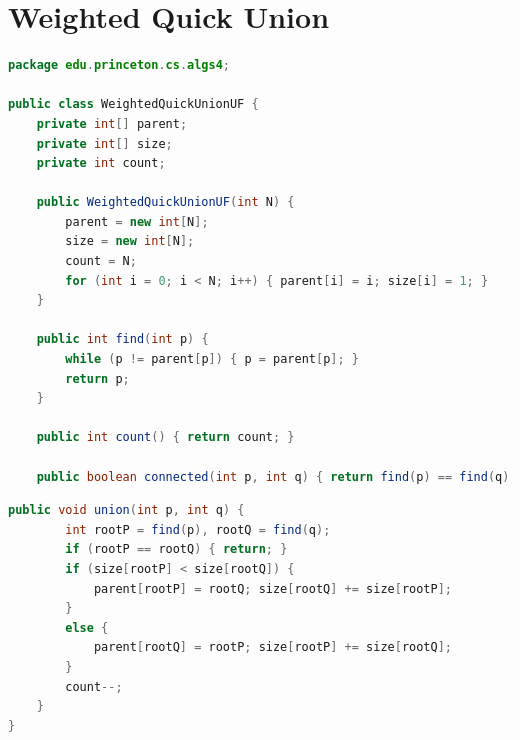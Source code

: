 \documentclass[8pt,a4paper,compress]{beamer}
\begin{document}
\section{Weighted Quick Union}
\begin{frame}[fragile]
\pause

\begin{lstlisting}[language=Java,style=focusin]
package edu.princeton.cs.algs4;

public class WeightedQuickUnionUF {
    private int[] parent;
    private int[] size;
    private int count;

    public WeightedQuickUnionUF(int N) {
        parent = new int[N];
        size = new int[N];
        count = N;
        for (int i = 0; i < N; i++) { parent[i] = i; size[i] = 1; }
    }

    public int find(int p) {
        while (p != parent[p]) { p = parent[p]; }
        return p;
    }

    public int count() { return count; }
  
    public boolean connected(int p, int q) { return find(p) == find(q); }

\end{lstlisting}
\end{frame}

\begin{frame}[fragile]
\pause

\begin{lstlisting}[language=Java,style=focusin]
    public void union(int p, int q) {
        int rootP = find(p), rootQ = find(q);
        if (rootP == rootQ) { return; }
        if (size[rootP] < size[rootQ]) {
            parent[rootP] = rootQ; size[rootQ] += size[rootP];
        }
        else {
            parent[rootQ] = rootP; size[rootP] += size[rootQ];
        }
        count--;
    }
}
\end{lstlisting}
\end{frame}
\end{document}

